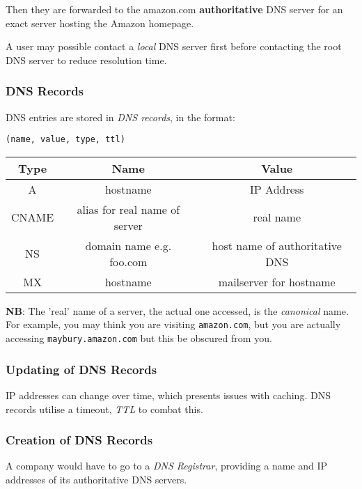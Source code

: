 \documentclass{article}
\begin{document}
Then they are forwarded to the amazon.com \textbf{authoritative} DNS server for an exact server hosting the Amazon homepage.

A user may possible contact a \textit{local} DNS server first before contacting the root DNS server to reduce resolution time.

\subsubsection{DNS Records}

DNS entries are stored in \textit{DNS records}, in the format:

\begin{center}
  
  \texttt{(name, value, type, ttl)}

  \begin{tabular}{|c|c|c|}
    \hline
    \textbf{Type} & \textbf{Name} & \textbf{Value} \\
    \hline
    A & hostname & IP Address\\
    \hline
    CNAME & alias for real name of server & real name\\
    \hline
    NS & domain name e.g. foo.com & host name of authoritative DNS\\
    \hline
    MX & hostname & mailserver for hostname\\
    \hline
  \end{tabular}
\end{center}

\textbf{NB}: The 'real' name of a server, the actual one accessed, is the \textit{canonical} name. For example, you may think you are visiting \texttt{amazon.com}, but you are actually accessing \texttt{maybury.amazon.com} but this be obscured from you.

\subsubsection{Updating of DNS Records}

IP addresses can change over time, which presents issues with caching. DNS records utilise a timeout, \textit{TTL} to combat this. 

\subsubsection{Creation of DNS Records}

A company would have to go to a \textit{DNS Registrar}, providing a name and IP addresses of its authoritative DNS servers.
\end{document}
